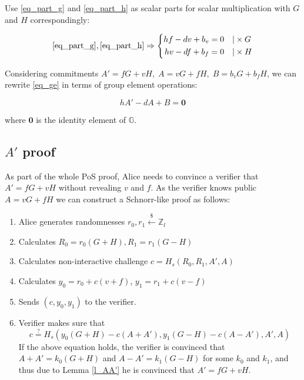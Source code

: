 \documentclass{article}
\numberwithin{figure}{section}
\begin{document}
Use \eqref{eq_part_g} and \eqref{eq_part_h} as scalar parts for scalar multiplication with $G$ and $H$ correspondingly:

\begin{equation} \label{eq_ge}
\eqref{eq_part_g}, \eqref{eq_part_h} \Rightarrow
\left\{ \begin{aligned} 
  h f - d v + b_v &= 0 \quad | \times G \\
  h v - d f + b_f &= 0 \quad | \times H
\end{aligned} \right.
\end{equation}

Considering commitments $A'=fG+vH, \; A=vG+fH, \; B=b_v G + b_f H$, we can rewrite \eqref{eq_ge} in terms of group element operations: 

\begin{equation} 
    hA'-dA+B=\mathbf{0} \label{eq_ge_fin}
\end{equation}

where $\mathbf{0}$ is the identity element of $\mathbb{G}$.


\subsection{$A'$ proof} \label{a_prime_proof}

As part of the whole PoS proof, Alice needs to convince a verifier that $A' = fG + vH$ without revealing $v$ and $f$. As the verifier knows public $A = vG + fH$ we can construct a Schnorr-like proof as follows:

\begin{enumerate}
    \item Alice generates randomnesses $r_0, r_1 \stackrel{\$}{\leftarrow} \mathbb{Z}_l$ 
    
    \item Calculates $R_0 = r_0 (G + H), R_1 = r_1 (G - H)$
    
    \item Calculates non-interactive challenge $c = H_s(R_0, R_1, A', A)$
    
    \item Calculates $y_0 = r_0 + c(v+f)$, $y_1 = r_1 + c(v-f)$
    
    \item Sends $(c, y_0, y_1)$ to the verifier.

    \item Verifier makes sure that
    \[ c \stackrel{?}{=} H_s(y_0(G+H)-c(A+A'), y_1(G-H)-c(A-A'), A', A)\]
    If the above equation holds, the verifier is convinced that $A+A'=k_0(G+H)$ and $A-A'=k_1(G-H)$ for some $k_0$ and $k_1$, and thus due to Lemma \ref{l_AA'} he is convinced that  $A' = fG + vH$.
\end{enumerate}
\end{document}
